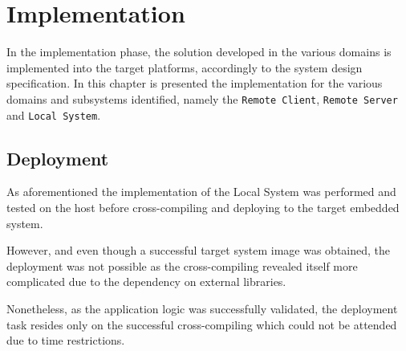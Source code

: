 \chapter{Implementation}
\label{cha:implementation}
In the implementation phase, the solution developed in the various domains is
implemented into the target platforms, accordingly to the system design
specification. In this chapter is presented the implementation for the various
domains and subsystems identified, namely the \texttt{Remote Client},
\texttt{Remote Server} and
\texttt{Local System}.



\section{Deployment}
\label{sec:deployment}
As aforementioned the implementation of the Local System was performed and
tested on the host before cross-compiling and deploying to the target embedded
system.

However, and even though a successful target system image was obtained, the deployment was not possible as the cross-compiling revealed itself
more complicated due to the dependency on external libraries.

Nonetheless, as the application logic was successfully validated, the deployment
task resides only on the successful cross-compiling which could not be attended
due to time restrictions.
